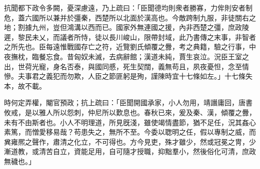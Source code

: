 \begin{pinyinscope}
抗聞都下政令多闕，憂深慮遠，乃上疏曰：「臣聞德均則衆者勝寡，力侔則安者制危，蓋六國所以兼并於彊秦，西楚所以北面於漢高也。今敵跨制九服，非徒關右之地；割據九州，豈但鴻溝以西而已。國家外無連國之援，內非西楚之彊，庶政陵遲，黎民未乂，而議者所恃，徒以長川峻山，限帶封域，此乃書傳之末事，非智者之所先也。臣每遠惟戰國存亡之符，近覽劉氏傾覆之釁，考之典籍，驗之行事，中夜撫枕，臨餐忘食。昔匈奴未滅，去病辭館；漢道未純，賈生哀泣。況臣王室之出，世荷光寵，身名否泰，與國同慼，死生契闊，義無苟且，夙夜憂怛，念至情慘。夫事君之義犯而勿欺，人臣之節匪躬是殉，謹陳時宜十七條如左。」十七條失本，故不載。

時何定弄權，閹官預政；抗上疏曰：「臣聞開國承家，小人勿用，靖譖庸回，唐書攸戒，是以雅人所以怨刺，仲尼所以歎息也。春秋已來，爰及秦、漢，傾覆之釁，未有不由斯者也。小人不明理道，所見旣淺，雖使竭情盡節，猶不足任，況其姦心素篤，而憎愛移易哉？苟患失之，無所不至。今委以聦明之任，假以專制之威，而兾雍熈之聲作，肅清之化立，不可得也。方今見吏，殊才雖少，然或冠冕之冑，少漸道教，或清苦自立，資能足用，自可隨才授職，抑黜羣小，然後俗化可清，庶政無穢也。」


\end{pinyinscope}
